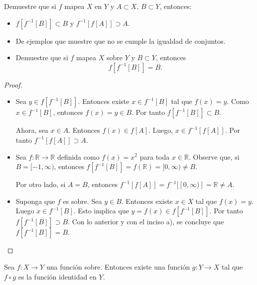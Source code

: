 \documentclass[12pt]{article}
\newcommand{\R}{\mathbb{R}}
\newenvironment{problem}[2][Problema]{\begin{trivlist}
\item[\hskip \labelsep {\bfseries #1}\hskip \labelsep {\bfseries #2.}]}{\end{trivlist}}
\begin{document}
\begin{problem}{18} Demuestre que si $f$ mapea $X$ en $Y$ y $A \subset X $, $B \subset Y$, entonces:
\begin{itemize}
    \item [a)] $f[f^{-1}[B]] \subset B$ y $f^{-1}[f[A]] \supset A$.
    \item [b)] De ejemplos que muestre que no se cumple la igualdad de conjuntos.
    \item[c)] Demuestre que si $f$ mapea $X$ sobre $Y$ y $B \subset Y$, entonces $$f[f^{-1}[B]] = B. $$ 
\end{itemize}

\end{problem}
\begin{proof}\text{ }
\begin{itemize}
    \item[a)] Sea $y \in f[f^{-1}[B]].$ Entonces existe $x \in f^{-1}[B]$ tal que $f(x) = y$. Como $x \in  f^{-1}[B]$, entonces $f(x) = y \in B$. Por tanto $f[f^{-1}[B]] \subset B$.
    
    Ahora, sea $x \in A$. Entonces $f(x) \in f[A]$. Luego, $x \in f^{-1}[f[A]]$. Por tanto  $f^{-1}[f[A]] \supset A$.
    
    \item [b)] Sea $f: \R \rightarrow \R$ definida como $f(x) = x^2$ para toda $x \in \R$. Observe que, si $B = [-1, \infty)$, entonces $f[f^{-1}[B]] = f(\R) = [0, \infty) \neq B$.
    
    Por otro lado, si $A = B$, entonces $f^{-1}[f[A]] = f^{-1}[[0, \infty)] = \R \neq A $.
    
    \item [c)] Suponga que $f$ es sobre. Sea $y \in B$. Entonces existe $x \in X$ tal que $f(x) = y$. Luego $x \in f^{-1}[B]$. Esto implica que $y = f(x) \in f[f^{-1}[B]].$ Por tanto $f[f^{-1}[B]] \supset  B$. Con lo anterior y con el inciso a), se concluye que $f[f^{-1}[B]] = B.$
\end{itemize}
\end{proof}

\text{ }

\begin{problem}{20} Sea $f: X \rightarrow Y$ una función sobre. Entonces existe una función $g: Y \rightarrow X$ tal que $f \circ g$ es la función identidad en $Y$.

\end{problem}
\end{document}
